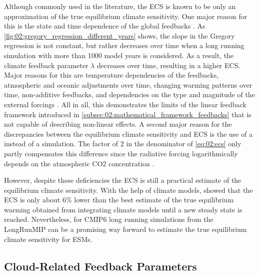 Although commonly used in the literature, the \ac{ECS} is known to be only an
approximation of the true equilibrium climate sensitivity. One major reason for
this is the state and time dependence of the global feedbacks
\autocite{Knutti2015, Knutti2017}. As
\cref{fig:02:gregory_regression_different_years} shows, the slope in the
Gregory regression is not constant, but rather decreases over time when a long
running  simulation with more than 1000 model years is considered.
As a result, the climate feedback parameter $\lambda$ decreases over time,
resulting in a higher \ac{ECS}. Major reasons for this are temperature
dependencies of the feedbacks, atmospheric and oceanic adjustments over time,
changing warming patterns over time, non-additive feedbacks, and dependencies
on the type and magnitude of the external forcings \autocite{Knutti2017}. All
in all, this demonstrates the limits of the linear feedback framework
introduced in \cref{subsec:02:mathematical_framework_feedbacks} that is not
capable of describing non-linear effects. A second major reason for the
discrepancies between the equilibrium climate sensitivity and \ac{ECS} is the
use of a  instead of a  simulation. The factor of $2$ in
the denominator of \cref{eq:02:ecs} only partly compensates this difference
since the radiative forcing logarithmically depends on the atmospheric \ac{CO2}
concentration \autocite{Huang2014}.

However, despite these deficiencies the \ac{ECS} is still a practical estimate
of the equilibrium climate sensitivity. With the help of climate models,
\textcite{Sherwood2020} showed that the \ac{ECS} is only about $6 \unit{\%}$
lower than the best estimate of the true equilibrium warming obtained from
integrating climate models until a new steady state is reached. Nevertheless,
for \acs{CMIP}6 long running simulations from the \ac{LongRunMIP}
\autocite{Rugenstein2019} can be a promising way forward to estimate the true
equilibrium climate sensitivity for \acp{ESM}.


\subsection{Cloud-Related Feedback Parameters}
\label{subsec:02:cloud_feedback_parameters}

